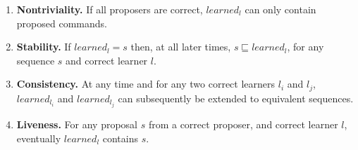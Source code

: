 %
\begin{enumerate}
\item \textbf{Nontriviality.} If all proposers are correct, $learned_l$ can only contain proposed commands.
\item \textbf{Stability.} If $learned_l = s$ then, at all later times, $s \sqsubseteq learned_l$, for any sequence $s$ and correct learner $l$.
\item \textbf{Consistency.} At any time and for any two correct learners $l_i$ and $l_j$, $learned_{l_i}$ and $learned_{l_j}$ 
can subsequently be extended to equivalent sequences.
\item \textbf{Liveness.} For any proposal $s$ from a correct proposer, and correct learner $l$, eventually $learned_l$ contains $s$.
\end{enumerate}
